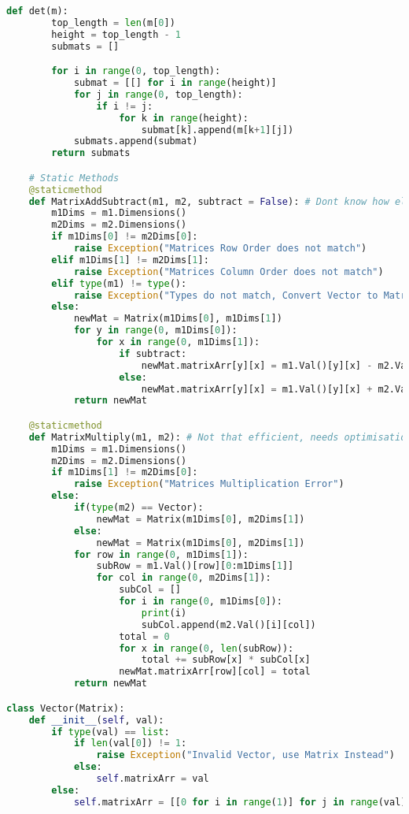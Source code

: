 \begin{flushleft}
\begin{enumerate}
\begin{lstlisting}[language=Python]
    def det(m):
        top_length = len(m[0])
        height = top_length - 1
        submats = []

        for i in range(0, top_length):
            submat = [[] for i in range(height)]
            for j in range(0, top_length):
                if i != j:
                    for k in range(height):
                        submat[k].append(m[k+1][j])
            submats.append(submat)
        return submats

    # Static Methods
    @staticmethod
    def MatrixAddSubtract(m1, m2, subtract = False): # Dont know how else i would make this more efficient lol
        m1Dims = m1.Dimensions()
        m2Dims = m2.Dimensions()
        if m1Dims[0] != m2Dims[0]:
            raise Exception("Matrices Row Order does not match")
        elif m1Dims[1] != m2Dims[1]:
            raise Exception("Matrices Column Order does not match")
        elif type(m1) != type():
            raise Exception("Types do not match, Convert Vector to Matrix or vice verse")
        else:
            newMat = Matrix(m1Dims[0], m1Dims[1])
            for y in range(0, m1Dims[0]):
                for x in range(0, m1Dims[1]):
                    if subtract:
                        newMat.matrixArr[y][x] = m1.Val()[y][x] - m2.Val()[y][x]
                    else:
                        newMat.matrixArr[y][x] = m1.Val()[y][x] + m2.Val()[y][x]
            return newMat

    @staticmethod
    def MatrixMultiply(m1, m2): # Not that efficient, needs optimisation
        m1Dims = m1.Dimensions()
        m2Dims = m2.Dimensions()
        if m1Dims[1] != m2Dims[0]:
            raise Exception("Matrices Multiplication Error")
        else:
            if(type(m2) == Vector):
                newMat = Matrix(m1Dims[0], m2Dims[1])
            else:
                newMat = Matrix(m1Dims[0], m2Dims[1])
            for row in range(0, m1Dims[1]):
                subRow = m1.Val()[row][0:m1Dims[1]]
                for col in range(0, m2Dims[1]):
                    subCol = []
                    for i in range(0, m1Dims[0]):
                        print(i)
                        subCol.append(m2.Val()[i][col])
                    total = 0
                    for x in range(0, len(subRow)):
                        total += subRow[x] * subCol[x]
                    newMat.matrixArr[row][col] = total
            return newMat

class Vector(Matrix):
    def __init__(self, val):
        if type(val) == list:
            if len(val[0]) != 1:
                raise Exception("Invalid Vector, use Matrix Instead")
            else:
                self.matrixArr = val
        else:
            self.matrixArr = [[0 for i in range(1)] for j in range(val)]


\end{lstlisting}
\end{enumerate}
\end{flushleft}

